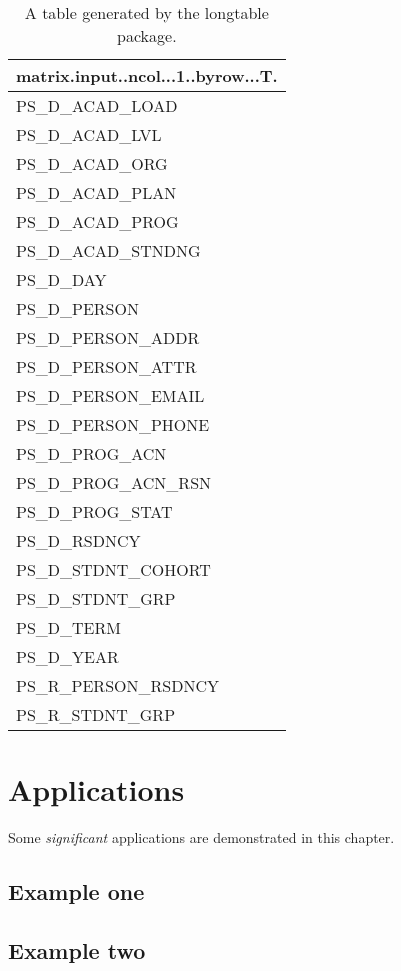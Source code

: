 \documentclass[
]{book}
\begin{document}
\begin{longtable}[t]{l}
\caption{\label{tab:table-data-term-enrollment}A table generated by the longtable package.}\\
\toprule
matrix.input..ncol...1..byrow...T.\\
\midrule
PS\_D\_ACAD\_LOAD\\
PS\_D\_ACAD\_LVL\\
PS\_D\_ACAD\_ORG\\
PS\_D\_ACAD\_PLAN\\
PS\_D\_ACAD\_PROG\\
\addlinespace
PS\_D\_ACAD\_STNDNG\\
PS\_D\_DAY\\
PS\_D\_PERSON\\
PS\_D\_PERSON\_ADDR\\
PS\_D\_PERSON\_ATTR\\
\addlinespace
PS\_D\_PERSON\_EMAIL\\
PS\_D\_PERSON\_PHONE\\
PS\_D\_PROG\_ACN\\
PS\_D\_PROG\_ACN\_RSN\\
PS\_D\_PROG\_STAT\\
\addlinespace
PS\_D\_RSDNCY\\
PS\_D\_STDNT\_COHORT\\
PS\_D\_STDNT\_GRP\\
PS\_D\_TERM\\
PS\_D\_YEAR\\
\addlinespace
PS\_R\_PERSON\_RSDNCY\\
PS\_R\_STDNT\_GRP\\
\bottomrule
\end{longtable}

\hypertarget{applications}{%
\chapter{Applications}\label{applications}}

Some \emph{significant} applications are demonstrated in this chapter.

\hypertarget{example-one}{%
\section{Example one}\label{example-one}}

\hypertarget{example-two}{%
\section{Example two}\label{example-two}}
\end{document}
